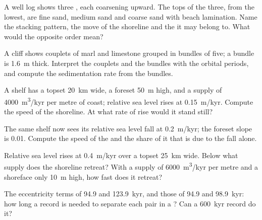 \begin{exercise}[$\star$]\label{exo:b3:sequence-stratigraphy:3}
A well log shows three , each coarsening upward. The tops of
the three, from the lowest, are fine sand, medium sand and coarse sand with
beach lamination. Name the stacking pattern, the move of the shoreline and
the  it may belong to. What would the opposite order mean?
\end{exercise}

\begin{exercise}[$\star$]\label{exo:b3:sequence-stratigraphy:4}
A cliff shows couplets of marl and limestone grouped in bundles of five; a
bundle is \qty{1.6}{m} thick. Interpret the couplets and the bundles with the
orbital periods, and compute the sedimentation rate from the bundles.
\end{exercise}

\begin{exercise}[$\star\star$]\label{exo:b3:sequence-stratigraphy:5}
A shelf has a topset \qty{20}{km} wide, a foreset \qty{50}{m} high, and a
supply of \qty{4000}{m^3/kyr} per metre of coast; relative sea level rises
at \qty{0.15}{m/kyr}. Compute the speed of the shoreline. At what rate of
rise would it stand still?
\end{exercise}

\begin{exercise}[$\star\star$]\label{exo:b3:sequence-stratigraphy:6}
The same shelf now sees its relative sea level fall at \qty{0.2}{m/kyr}; the
foreset slope is 0.01. Compute the speed of the  and the
share of it that is due to the fall alone.
\end{exercise}

\begin{exercise}[$\star\star$]\label{exo:b3:sequence-stratigraphy:7}
Relative sea level rises at \qty{0.4}{m/kyr} over a topset \qty{25}{km} wide.
Below what supply does the shoreline retreat? With a supply of
\qty{6000}{m^3/kyr} per metre and a shoreface only \qty{10}{m} high, how
fast does it retreat?
\end{exercise}

\begin{exercise}[$\star\star$]\label{exo:b3:sequence-stratigraphy:8}
The eccentricity terms of 94.9 and \qty{123.9}{kyr}, and those of 94.9 and
\qty{98.9}{kyr}: how long a record is needed to separate each pair in a
? Can a \qty{600}{kyr} record do it?
\end{exercise}

